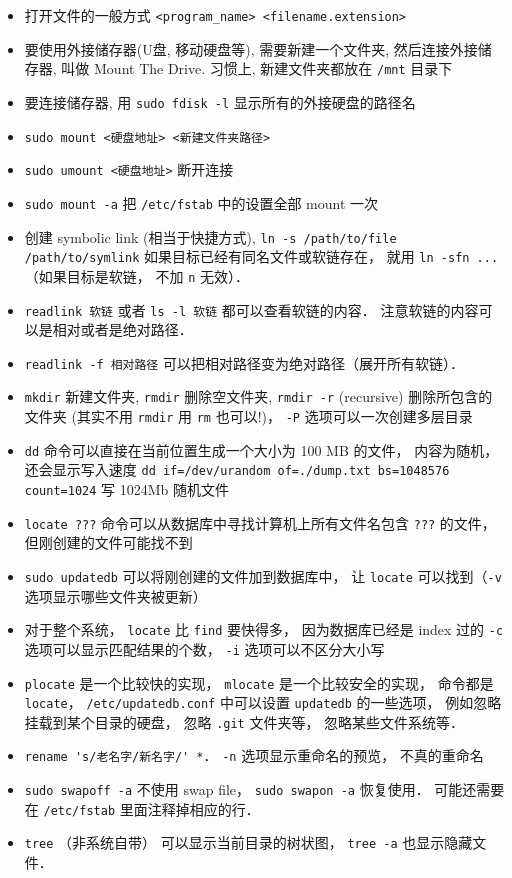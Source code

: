 \begin{itemize}
\item 打开文件的一般方式 \verb`<program_name> <filename.extension>`
\item 要使用外接储存器(U盘, 移动硬盘等), 需要新建一个文件夹, 然后连接外接储存器, 叫做 Mount The Drive. 习惯上, 新建文件夹都放在 \verb`/mnt` 目录下
\item 要连接储存器, 用 \verb`sudo fdisk -l` 显示所有的外接硬盘的路径名
\item \verb`sudo mount <硬盘地址> <新建文件夹路径>`
\item \verb`sudo umount <硬盘地址>` 断开连接
\item \verb`sudo mount -a` 把 \verb|/etc/fstab| 中的设置全部 mount 一次
\item 创建 symbolic link (相当于快捷方式), \verb`ln -s /path/to/file /path/to/symlink` 如果目标已经有同名文件或软链存在， 就用 \verb|ln -sfn ...| （如果目标是软链， 不加 \verb|n| 无效）．
\item \verb|readlink 软链| 或者 \verb|ls -l 软链| 都可以查看软链的内容． 注意软链的内容可以是相对或者是绝对路径．
\item \verb|readlink -f 相对路径| 可以把相对路径变为绝对路径（展开所有软链）．
\item \verb`mkdir` 新建文件夹, \verb`rmdir` 删除空文件夹, \verb`rmdir -r` (recursive) 删除所包含的文件夹 (其实不用 \verb`rmdir` 用 \verb`rm` 也可以!)， \verb`-P` 选项可以一次创建多层目录
\item \verb`dd` 命令可以直接在当前位置生成一个大小为 100 MB 的文件， 内容为随机， 还会显示写入速度
\verb`dd if=/dev/urandom of=./dump.txt bs=1048576 count=1024` 写 1024Mb 随机文件
\item \verb`locate ???` 命令可以从数据库中寻找计算机上所有文件名包含 \verb`???` 的文件， 但刚创建的文件可能找不到
\item \verb`sudo updatedb` 可以将刚创建的文件加到数据库中， 让 \verb`locate` 可以找到（\verb|-v| 选项显示哪些文件夹被更新）
\item 对于整个系统， \verb`locate` 比 \verb`find` 要快得多， 因为数据库已经是 index 过的 \verb`-c` 选项可以显示匹配结果的个数， \verb`-i` 选项可以不区分大小写
\item \verb|plocate| 是一个比较快的实现， \verb|mlocate| 是一个比较安全的实现， 命令都是 \verb|locate|， \verb|/etc/updatedb.conf| 中可以设置 \verb|updatedb| 的一些选项， 例如忽略挂载到某个目录的硬盘， 忽略 \verb|.git| 文件夹等， 忽略某些文件系统等．
\item \verb|rename 's/老名字/新名字/' *|． \verb|-n| 选项显示重命名的预览， 不真的重命名
\item \verb|sudo swapoff -a| 不使用 swap file， \verb|sudo swapon -a| 恢复使用． 可能还需要在 \verb|/etc/fstab| 里面注释掉相应的行．
\item \verb|tree| （非系统自带） 可以显示当前目录的树状图， \verb|tree -a| 也显示隐藏文件．
\end{itemize}

